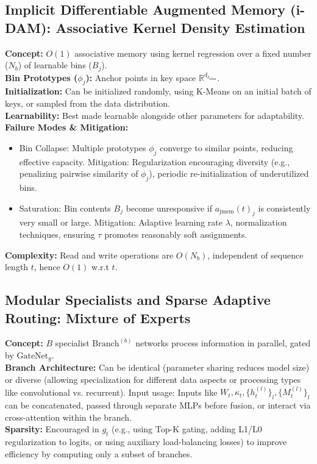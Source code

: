 \documentclass{article}
\begin{document}
\subsection{Implicit Differentiable Augmented Memory (i-DAM): Associative Kernel Density Estimation}
\textbf{Concept:} $O(1)$ associative memory using kernel regression over a fixed number ($N_b$) of learnable bins ($B_j$). \\
\textbf{Bin Prototypes ($\phi_j$):} Anchor points in key space $\mathbb{R}^{d_{k_{\text{idam}}}}$. \\
\textbf{Initialization:} Can be initialized randomly, using K-Means on an initial batch of keys, or sampled from the data distribution. \\
\textbf{Learnability:} Best made learnable alongside other parameters for adaptability. \\
\textbf{Failure Modes \& Mitigation:}
\begin{itemize}
    \item Bin Collapse: Multiple prototypes $\phi_j$ converge to similar points, reducing effective capacity. Mitigation: Regularization encouraging diversity (e.g., penalizing pairwise similarity of $\phi_j$), periodic re-initialization of underutilized bins.
    \item Saturation: Bin contents $B_j$ become unresponsive if $a_{\text{jmem}}(t)_j$ is consistently very small or large. Mitigation: Adaptive learning rate $\lambda$, normalization techniques, ensuring $\tau$ promotes reasonably soft assignments.
\end{itemize}
\textbf{Complexity:} Read and write operations are $O(N_b)$, independent of sequence length $t$, hence $O(1)$ w.r.t $t$.

\subsection{Modular Specialists and Sparse Adaptive Routing: Mixture of Experts}
\textbf{Concept:} $B$ specialist $\text{Branch}^{(b)}$ networks process information in parallel, gated by $\text{GateNet}_g$. \\
\textbf{Branch Architecture:} Can be identical (parameter sharing reduces model size) or diverse (allowing specialization for different data aspects or processing types like convolutional vs. recurrent). Input usage: Inputs like $W_t, \kappa_t, \{h_t^{(l)}\}_l, \{M_t^{(l)}\}_l$ can be concatenated, passed through separate MLPs before fusion, or interact via cross-attention within the branch. \\
\textbf{Sparsity:} Encouraged in $g_t$ (e.g., using Top-K gating, adding L1/L0 regularization to logits, or using auxiliary load-balancing losses) to improve efficiency by computing only a subset of branches.
\end{document}
